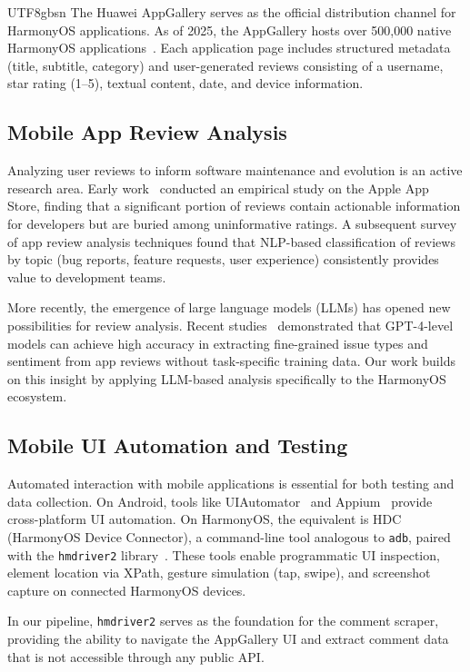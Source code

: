 \documentclass[11pt,a4paper]{article}
\begin{document}
\begin{CJK*}{UTF8}{gbsn}
The Huawei AppGallery serves as the official distribution channel for HarmonyOS applications. As of 2025, the AppGallery hosts over 500,000 native HarmonyOS applications~\cite{appgallery_stats}. Each application page includes structured metadata (title, subtitle, category) and user-generated reviews consisting of a username, star rating (1--5), textual content, date, and device information.

\subsection{Mobile App Review Analysis}

Analyzing user reviews to inform software maintenance and evolution is an active research area. Early work~\cite{pagano13} conducted an empirical study on the Apple App Store, finding that a significant portion of reviews contain actionable information for developers but are buried among uninformative ratings. A subsequent survey~\cite{martin17} of app review analysis techniques found that NLP-based classification of reviews by topic (bug reports, feature requests, user experience) consistently provides value to development teams.

More recently, the emergence of large language models (LLMs) has opened new possibilities for review analysis. Recent studies~\cite{zou2024} demonstrated that GPT-4-level models can achieve high accuracy in extracting fine-grained issue types and sentiment from app reviews without task-specific training data. Our work builds on this insight by applying LLM-based analysis specifically to the HarmonyOS ecosystem.

\subsection{Mobile UI Automation and Testing}

Automated interaction with mobile applications is essential for both testing and data collection. On Android, tools like UIAutomator~\cite{uiautomator} and Appium~\cite{appium} provide cross-platform UI automation. On HarmonyOS, the equivalent is HDC (HarmonyOS Device Connector), a command-line tool analogous to \texttt{adb}, paired with the \texttt{hmdriver2} library~\cite{hmdriver2}. These tools enable programmatic UI inspection, element location via XPath, gesture simulation (tap, swipe), and screenshot capture on connected HarmonyOS devices.

In our pipeline, \texttt{hmdriver2} serves as the foundation for the comment scraper, providing the ability to navigate the AppGallery UI and extract comment data that is not accessible through any public API.



\end{CJK*}
\end{document}
